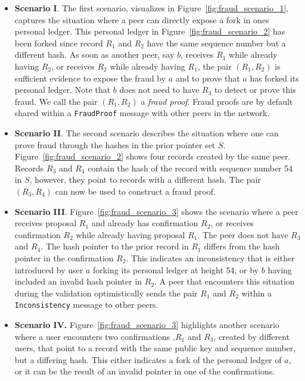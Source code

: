 \begin{itemize}
	\item \textbf{Scenario I}. 
	The first scenario, visualizes in Figure~\ref{fig:fraud_scenario_1}, captures the situation where a peer can directly expose a fork in ones personal ledger.
	This personal ledger in Figure~\ref{fig:fraud_scenario_2} has been forked since record $ R_1 $ and $ R_2 $ have the same sequence number but a different hash.
	As soon as another peer, say $ b $, receives $ R_1 $ while already having $ R_2 $, or receives $ R_2 $ while already having $ R_1 $, the pair $ (R_1, R_2) $ is sufficient evidence to expose the fraud by $ a $ and to prove that $ a $ has forked its personal ledger.
	Note that $ b $ does not need to have $ R_3 $ to detect or prove this fraud.
	We call the pair $ (R_1, R_2) $ a \emph{fraud proof}.
	Fraud proofs are by default shared within a \texttt{FraudProof} message with other peers in the \ModelName{} network.
	\item \textbf{Scenario II}. The second scenario describes the situation where one can prove fraud through the hashes in the prior pointer set $ S $.
	Figure~\ref{fig:fraud_scenario_2} shows four records created by the same peer.
	Records $ R_3 $ and $ R_4 $ contain the hash of the record with sequence number 54 in $ S $, however, they point to records with a different hash.
	The pair $ (R_3, R_4) $ can now be used to construct a fraud proof.
	\item \textbf{Scenario III}.
	Figure~\ref{fig:fraud_scenario_3} shows the scenario where a peer receives proposal $ R_1 $ and already has confirmation $ R_2 $, or receives confirmation $ R_2 $ while already having proposal $ R_1 $.
	The peer does not have $ R_3 $ and $ R_4 $.
	The hash pointer to the prior record in $ R_1 $ differs from the hash pointer in the confirmation $ R_2 $.
	This indicates an inconsistency that is either introduced by user $ a $ forking its personal ledger at height 54, or by $ b $ having included an invalid hash pointer in $ R_2 $.
	A peer that encounters this situation during the validation optimistically sends the pair $ R_1 $ and $ R_2 $ within a \texttt{Inconsistency} message to other peers.
	\item \textbf{Scenario IV.}
	Figure~\ref{fig:fraud_scenario_3} highlights another scenario where a user encounters two confirmations ,$ R_1 $ and $ R_3 $, created by different users, that point to a record with the same public key and sequence number, but a differing hash.
	This either indicates a fork of the personal ledger of $ a $, or it can be the result of an invalid pointer in one of the confirmations.
\end{itemize}

